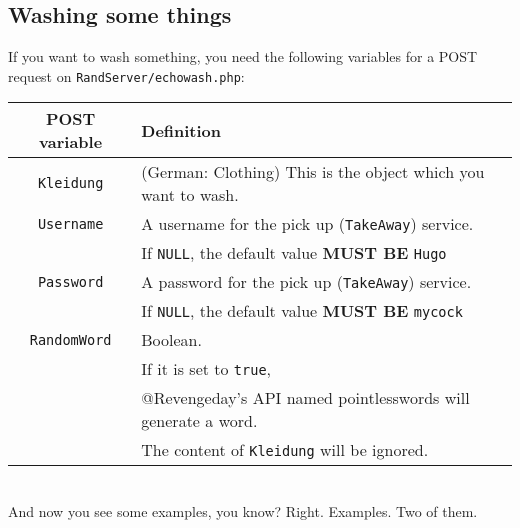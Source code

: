 \documentclass[letterpaper,twoside]{scrartcl}
\begin{document}
   \newline\newline


  \subsection{Washing some things}
   If you want to wash something, you need the following variables for a POST request on \texttt{RandServer/echowash.php}:
   \newline
   
   \begin{tabular}[ht]{|c|l|}
    \hline
    POST variable & Definition \\
    \hline\hline
    \texttt{Kleidung} & (German: Clothing) This is the object which you want to wash.\\
    \hline
    \texttt{Username} & A username for the pick up (\texttt{TakeAway}) service. \\ 
	  & If \texttt{NULL}, the default value \textbf{MUST BE} \texttt{Hugo}\\
    \hline
    \texttt{Password} & A password for the pick up (\texttt{TakeAway}) service. \\ 
 	  & If \texttt{NULL}, the default value \textbf{MUST BE} \texttt{mycock}\\
    \hline
    \texttt{RandomWord} & Boolean. \\
            & If it is set to \texttt{true}, \\
	    & @Revengeday's API named pointlesswords will generate a word.\\
	    & The content of \texttt{Kleidung} will be ignored.\\
    \hline
   \end{tabular}
   \\
   \newline
   And now you see some examples, you know?\newline
   Right.\newline 
   Examples.\newline
   Two of them.\newline
\end{document}
